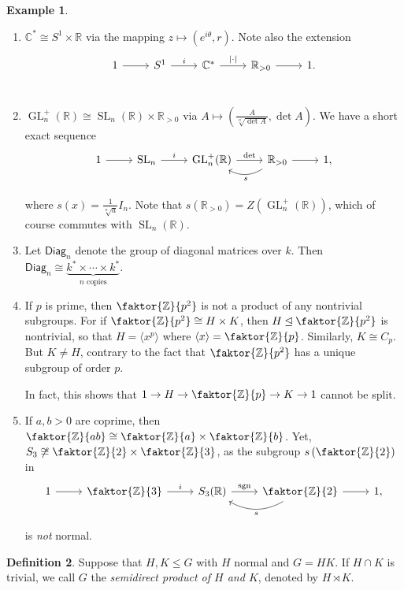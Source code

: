 \documentclass[10pt,letterpaper,cm]{nupset}
\theoremstyle{definition}
\newtheorem{definition}{Definition}[subsection]
\newtheorem{exmp}[definition]{Example}
\theoremstyle{theorem}
\theoremstyle{remark}
\newcommand{\C}{\mathbb C}
\newcommand{\R}{\mathbb R}
\newcommand{\Z}{\mathbb Z}
\newcommand{\1}{\mathbf{1}}
\newcommand{\0}{\vec 0}
\DeclareMathOperator*{\GL}{GL}
\DeclareMathOperator*{\SL}{SL}
\DeclareMathOperator{\sgn}{sgn}
\begin{document}
\begin{exmp} $ $
\begin{enumerate}
\item $\C^{\ast} \cong S^1 \times \R$ via the mapping $z \mapsto \left(e^{i\theta}, r\right)$. Note also the extension \[
	\begin{tikzcd}
	1\rar & S^1\rar["i" above] & \C^{\ast}\rar["\lvert{\cdot}\rvert" above] & \R_{>0}\rar & 1. \\
	\end{tikzcd}
\]
\item $\GL_n^{+}(\R) \cong \SL_n(\R) \times \R_{>0}$ via $A\mapsto \left(\frac{A}{\sqrt[n]{\det A}}, \det A\right)$.
We have a short exact sequence  \[
	\begin{tikzcd}
	1\rar & \SL_n\rar["i" above] & \GL_n^{+}(\R)\rar["\det" above] & \R_{>0}\rar\lar[bend left=30,"s" below] & 1, \\
	\end{tikzcd}
\] where $s(x) = \frac{1}{\sqrt[n]{a}}I_n$. Note that $s(\R_{>0}) = Z(\GL_n^+(\R))$, which of course commutes with $\SL_n(\R)$.
\item Let $\mathsf{Diag}_n$ denote the group of diagonal matrices over $k$. Then $\mathsf{Diag}_n \cong \underbrace{k^{\ast}\times \cdots \times k^{\ast}}_{n \text{ copies}}.$
\item If $p$ is prime, then $\faktor{\Z}{p^2}$ is not a product of any nontrivial subgroups. For if $\faktor{\Z}{p^2} \cong H \times K$, then $H \unlhd \faktor{\Z}{p^2}$ is nontrivial, so that $H = \langle x^p \rangle$ where $\langle x \rangle = \faktor{\Z}{p}$. Similarly, $K \cong C_p$. But $K \ne H$, contrary to the fact that $\faktor{\Z}{p^2}$ has a unique subgroup of order $p$. 
\medskip

 In fact, this shows that $1 \to H \to \faktor{\Z}{p} \to K \to 1$ cannot be split.
\item If $a, b >0$ are coprime, then $\faktor{\Z}{ab} \cong \faktor{\Z}{a} \times \faktor{\Z}{b}$. Yet, $S_3 \not \cong \faktor{\Z}{2} \times \faktor{\Z}{3}$, as the subgroup $s\left(\faktor{\Z}{2}\right)$ in 
\[
	\begin{tikzcd}
	1\rar & \faktor{\Z}{3}\rar["i" above] & S_3(\R)\rar["\sgn" above] & \faktor{\Z}{2}\rar\lar[bend left=30,"s" below] & 1, \\
	\end{tikzcd}
\] is \emph{not} normal.
\end{enumerate}
\end{exmp}

\begin{definition}
Suppose that $H, K\leq G$ with $H$ normal and $G = HK$. If $H \cap K$ is trivial, we call $G$ the \textit{semidirect product of $H$ and $K$}, denoted by $H \rtimes K$.
\end{definition}
\end{document}

